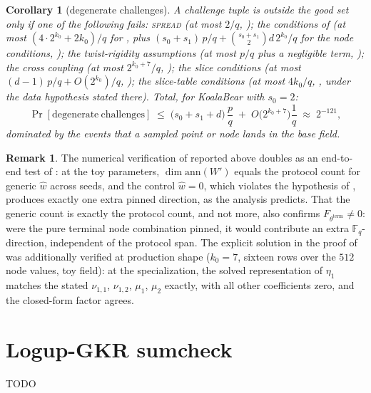 \documentclass{article}
\newcommand{\Fq}{\mathbb{F}_q}
\newcommand{\extdeg}{d}
\newtheorem{corollary}[theorem]{Corollary}
\theoremstyle{definition}
\newtheorem{remark}[theorem]{Remark}
\begin{document}
\begin{corollary}[degenerate challenges]\label{cor:restart}
A challenge tuple is outside the good set only if one of the following fails: \textsc{spread} (at most $2/q$, ); the conditions of  (at most $(4 \cdot 2^{k_0} + 2k_0)/q$ for , plus $(s_0 + s_1)\, p/q + \binom{s_0 + s_1}{2} \extdeg\, 2^{k_0}/q$ for the node conditions, ); the twist-rigidity assumptions (at most $p/q$ plus a negligible term, ); the cross coupling (at most $2^{k_0+7}/q$, ); the slice conditions (at most $(\extdeg - 1)\, p/q + O(2^{k_0})/q$, ); the slice-table conditions (at most $4 k_0 / q$, , under the data hypothesis stated there). Total, for KoalaBear with $s_0 = 2$:
\[
\Pr[\mathrm{degenerate\ challenges}] \;\leq\; \big(s_0 + s_1 + \extdeg\big)\, \frac{p}{q} \;+\; O\big(2^{k_0 + 7}\big)\frac{1}{q} \;\approx\; 2^{-121} ,
\]
dominated by the events that a sampled point or node lands in the base field.
\end{corollary}

\begin{remark}
The numerical verification of  reported above doubles as an end-to-end test of : at the toy parameters, $\dim \mathrm{ann}(W')$ equals the protocol count for generic $\hat{w}$ across seeds, and the control $\hat{w} = 0$, which violates the hypothesis of , produces exactly one extra pinned direction, as the analysis predicts. That the generic count is exactly the protocol count, and not more, also confirms $F_{\theta^{\mathrm{term}}} \neq 0$: were the pure terminal node combination pinned, it would contribute an extra $\Fq$-direction, independent of the protocol span. The explicit solution in the proof of  was additionally verified at production shape ($k_0 = 7$, sixteen rows over the $512$ node values, toy field): at the specialization, the solved representation of $\eta_1$ matches the stated $\nu_{1,1}$, $\nu_{1,2}$, $\mu_1$, $\mu_2$ exactly, with all other coefficients zero, and the closed-form factor agrees.
\end{remark}

\section{Logup-GKR sumcheck}\label{sec:zk-logup-gkr}

TODO
\end{document}
